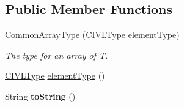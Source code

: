 \subsection*{Public Member Functions}
\begin{DoxyCompactItemize}
\item 
\hyperlink{classedu_1_1udel_1_1cis_1_1vsl_1_1civl_1_1model_1_1common_1_1type_1_1CommonArrayType_a38fc03a53c717b650cc5376cd2b219b0}{Common\+Array\+Type} (\hyperlink{interfaceedu_1_1udel_1_1cis_1_1vsl_1_1civl_1_1model_1_1IF_1_1type_1_1CIVLType}{C\+I\+V\+L\+Type} element\+Type)
\begin{DoxyCompactList}\small\item\em The type for an array of T. \end{DoxyCompactList}\item 
\hyperlink{interfaceedu_1_1udel_1_1cis_1_1vsl_1_1civl_1_1model_1_1IF_1_1type_1_1CIVLType}{C\+I\+V\+L\+Type} \hyperlink{classedu_1_1udel_1_1cis_1_1vsl_1_1civl_1_1model_1_1common_1_1type_1_1CommonArrayType_a051718877704f3c2fb668c3d38c4f2c1}{element\+Type} ()
\item 
\hypertarget{classedu_1_1udel_1_1cis_1_1vsl_1_1civl_1_1model_1_1common_1_1type_1_1CommonArrayType_aeaeaed4b8211794dc3a5c8ddd9b59ae8}{}String {\bfseries to\+String} ()\label{classedu_1_1udel_1_1cis_1_1vsl_1_1civl_1_1model_1_1common_1_1type_1_1CommonArrayType_aeaeaed4b8211794dc3a5c8ddd9b59ae8}


\end{DoxyCompactItemize}
